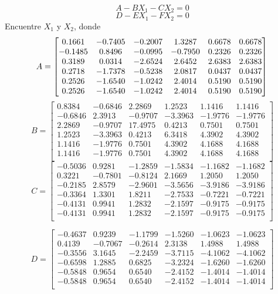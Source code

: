 \documentclass[paper=letter, fontsize=11pt]{scrartcl}
\numberwithin{equation}{section} %
\numberwithin{figure}{section} %
\numberwithin{table}{section} %
\newenvironment{cframed}[1][blue]
  {\begin{tcolorbox}[colframe=#1,colback=white]}
  {\end{tcolorbox}}
\begin{document}
\begin{enumerate}
\begin{cframed}[teal]
\begin{equation}
A-BX_1-CX_2 =0
\end{equation}
\begin{equation}
D-EX_1-FX_2 = 0
\end{equation}
Encuentre $X_1$ y $X_2$, donde 
\[ A = 
\begin{bmatrix}
0.1661& -0.7405& -0.2007& 1.3287& 0.6678 &0.6678\\
-0.1485& 0.8496& -0.0995& -0.7950& 0.2326& 0.2326\\
0.3189& 0.0314& -2.6524& 2.6452 &2.6383 &2.6383\\
0.2718& -1.7378& -0.5238& 2.0817 &0.0437 &0.0437\\
0.2526& -1.6540& -1.0242& 2.4014 &0.5190 &0.5190\\
0.2526& -1.6540& -1.0242& 2.4014 &0.5190 &0.5190\\
\end{bmatrix}\\
\]
\[
B = 
\begin{bmatrix}
0.8384& -0.6846& 2.2869& 1.2523& 1.1416& 1.1416\\
-0.6846& 2.3913& -0.9707& -3.3963& -1.9776& -1.9776\\
2.2869& -0.9707& 17.4975 &0.4213 &0.7501 &0.7501\\
1.2523& -3.3963& 0.4213 &6.3418 &4.3902 &4.3902\\
1.1416& -1.9776& 0.7501 &4.3902 &4.1688 &4.1688\\
1.1416& -1.9776& 0.7501 &4.3902 &4.1688 &4.1688\\
\end{bmatrix}
\]
\[
C = 
\begin{bmatrix}
-0.5036& 0.9281& -1.2859& -1.5834& -1.1682& -1.1682\\
0.3221& -0.7801& -0.8124& 2.1669& 1.2050& 1.2050\\
-0.2185& 2.8579& -2.9601& -3.5656& -3.9186& -3.9186\\
-0.3364& 1.3301& 1.8211& -2.7533& -0.7221& -0.7221\\
-0.4131& 0.9941& 1.2832& -2.1597& -0.9175& -0.9175\\
-0.4131& 0.9941& 1.2832 &-2.1597 &-0.9175& -0.9175\\
\end{bmatrix}
\]

\[
D = 
\begin{bmatrix}
-0.4637& 0.9239& -1.1799& -1.5260& -1.0623& -1.0623\\
0.4139& -0.7067& -0.2614& 2.3138& 1.4988& 1.4988\\
-0.3556& 3.1645& -2.2459& -3.7115& -4.1062& -4.1062\\
-0.6598& 1.2885& 0.6825& -3.2324& -1.6260& -1.6260\\
-0.5848& 0.9654& 0.6540 &-2.4152 &-1.4014& -1.4014\\
-0.5848& 0.9654& 0.6540 &-2.4152 &-1.4014& -1.4014\\
\end{bmatrix}
\]


\end{cframed}
\end{enumerate}
\end{document}
